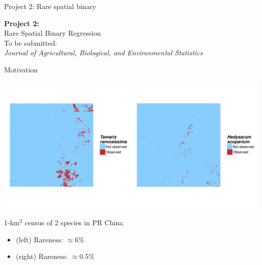 \documentclass{beamer}
\begin{document}
\begin{frame}{Project 2: Rare spatial binary}
	\begin{center}
		\LARGE
		\textbf{Project 2:}\\ [1em]
		Rare Spatial Binary Regression\\[2em]
		\normalsize
		To be submitted:\\
		\emph{Journal of Agricultural, Biological, and Environmental Statistics}
	\end{center}
\end{frame}

\begin{frame}{Motivation}
	\begin{center}
		\vspace{-3em}
		\includegraphics[width = 0.9\linewidth]{plant-census}
		\vspace{-1em}
		
		1-km$^2$ census of 2 species in PR China
	\end{center}
	\begin{itemize} \setlength{\itemsep}{0.5em}
		\item \tamarix{} (left) Rareness: $\approx 6\%$
		\item \hedysarum{} (right) Rareness: $\approx 0.5\%$
	\end{itemize}
\end{frame}
\end{document}
